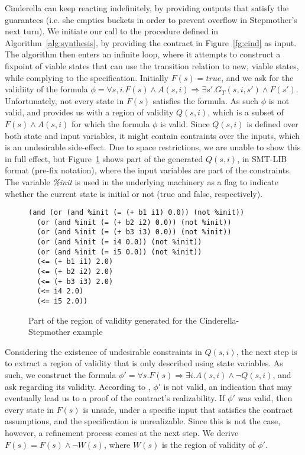 Cinderella can keep reacting indefinitely, by providing outputs that satisfy the
guarantees (i.e. she empties buckets in order to prevent overflow in Stepmother's next turn).
We initiate our call to the procedure defined in Algorithm~\ref{alg:synthesis},
by providing the contract in Figure~\ref{fg:cind} as input. The algorithm
then enters an infinite loop, where it attempts to construct a fixpoint of
viable states that can use the transition relation to new, viable states,
while complying to the specification. Initially $F(s) = true$, and we ask \aeval for the validiity of the formula $\phi = \forall s,i. F(s) \land A(s,i) \Rightarrow \exists
s'.G_{T}(s,i,s') \land F(s')$. Unfortunately, not every state in $F(s)$
satisfies the formula. As such $\phi$ is not valid, and \aeval provides us with
a region of validity $Q(s,i)$, which is a subset of $F(s) \land A(s,i)$ for
which the formula $\phi$ is valid. Since $Q(s,i)$ is defined over both state and
input variables, it might contain contraints over the inputs, which is an
undesirable side-effect. Due to space restrictions, we are unable to show this
in full effect, but Figure~\ref{fg:snippet} shows part of the generated
$Q(s,i)$, in SMT-LIB format (pre-fix notation), where the input variables are
part of the constraints. The variable \textit{\%init} is used in the underlying
machinery as a flag to indicate whether the current state is initial or not
(true and false, respectively).

\begin{figure}[!t]
\centering
 \begin{Verbatim}[fontsize=\scriptsize]
(and (or (and %init (= (+ b1 i1) 0.0)) (not %init))
  (or (and %init (= (+ b2 i2) 0.0)) (not %init))
  (or (and %init (= (+ b3 i3) 0.0)) (not %init))
  (or (and %init (= i4 0.0)) (not %init))
  (or (and %init (= i5 0.0)) (not %init))
  (<= (+ b1 i1) 2.0)
  (<= (+ b2 i2) 2.0)
  (<= (+ b3 i3) 2.0)
  (<= i4 2.0)
  (<= i5 2.0))
 \end{Verbatim}
\caption{Part of the region of validity generated for the Cinderella-Stepmother
example}
\label{fg:snippet}
\end{figure}

Considering the existence of undesirable constraints in $Q(s,i)$, the next step
is to extract a region of validity that is only described using state variables.
As such, we construct the formula $\phi' = \forall s. F(s) \Rightarrow \exists
i. A(s,i) \land \lnot Q(s,i)$, and ask \aeval regarding its validity. According
to \aeval, $\phi'$ is not valid, an indication that may eventually lead us to a
proof of the contract's realizability. If $\phi'$ was valid, then every state in
$F(s)$ is unsafe, under a specific input that satisfies the contract
assumptions, and the specification is unrealizable. Since this is not the case,
however, a refinement process comes at the next step. We derive $F(s) = F(s)
\land \lnot W(s)$, where $W(s)$ is the region of validity of $\phi'$.

